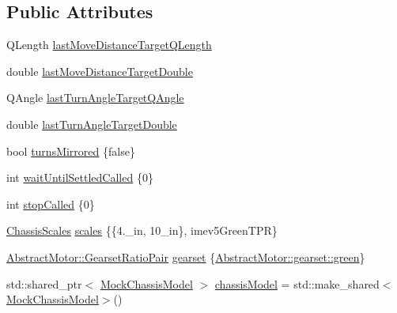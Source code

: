 \subsection*{Public Attributes}
\begin{DoxyCompactItemize}
\item 
Q\+Length \mbox{\hyperlink{classokapi_1_1MockChassisController_a5888e29de7126333af1fa09a9a31821f}{last\+Move\+Distance\+Target\+Q\+Length}}
\item 
double \mbox{\hyperlink{classokapi_1_1MockChassisController_ab3813bd7d83baa497d395be5022f8262}{last\+Move\+Distance\+Target\+Double}}
\item 
Q\+Angle \mbox{\hyperlink{classokapi_1_1MockChassisController_ad00fa209dcdff61228e43169aedbfcf3}{last\+Turn\+Angle\+Target\+Q\+Angle}}
\item 
double \mbox{\hyperlink{classokapi_1_1MockChassisController_a2318b7130fd6814f2f36d284f2beb323}{last\+Turn\+Angle\+Target\+Double}}
\item 
bool \mbox{\hyperlink{classokapi_1_1MockChassisController_a4a68a64d3336836a1f713c18d9490c52}{turns\+Mirrored}} \{false\}
\item 
int \mbox{\hyperlink{classokapi_1_1MockChassisController_a07d8dd68b0e94d9690d5ef1c3d0e741f}{wait\+Until\+Settled\+Called}} \{0\}
\item 
int \mbox{\hyperlink{classokapi_1_1MockChassisController_a8a78181ada8bda30a3cb92bb6cd66c0a}{stop\+Called}} \{0\}
\item 
\mbox{\hyperlink{classokapi_1_1ChassisScales}{Chassis\+Scales}} \mbox{\hyperlink{classokapi_1_1MockChassisController_a750c1b743e827f2e128c27375a6db685}{scales}} \{\{4.\+\_\+in, 10\+\_\+in\}, imev5\+Green\+T\+P\+R\}
\item 
\mbox{\hyperlink{structokapi_1_1AbstractMotor_1_1GearsetRatioPair}{Abstract\+Motor\+::\+Gearset\+Ratio\+Pair}} \mbox{\hyperlink{classokapi_1_1MockChassisController_a2556c9d70808bb6b2566c7f68f07b5e7}{gearset}} \{\mbox{\hyperlink{classokapi_1_1AbstractMotor_a88aaa6ea2fa10f5520a537bbf26774d5a9f27410725ab8cc8854a2769c7a516b8}{Abstract\+Motor\+::gearset\+::green}}\}
\item 
std\+::shared\+\_\+ptr$<$ \mbox{\hyperlink{classokapi_1_1MockChassisModel}{Mock\+Chassis\+Model}} $>$ \mbox{\hyperlink{classokapi_1_1MockChassisController_a698c575f9d7e064c6ecda7fb0c34ab97}{chassis\+Model}} = std\+::make\+\_\+shared$<$\mbox{\hyperlink{classokapi_1_1MockChassisModel}{Mock\+Chassis\+Model}}$>$()
\end{DoxyCompactItemize}


